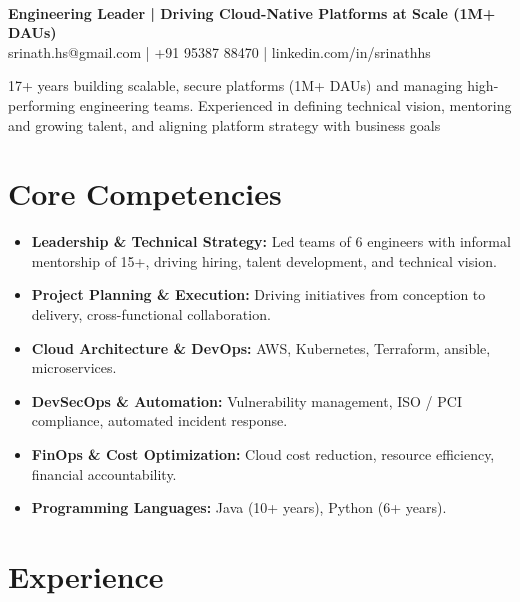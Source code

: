 \documentclass[11pt]{article}
\newcommand{\name}[1]{\noindent{\LARGE\sffamily\textbf{#1}}}
\begin{document}
\pagestyle{empty}
\color{bodytext}

\name{Srinath H S}\\[0.5em]
\textbf{Engineering Leader | Driving Cloud-Native Platforms at Scale (1M+ DAUs)
}\\[0.3em]
srinath.hs@gmail.com \quad | \quad +91 95387 88470 \quad | \quad linkedin.com/in/srinathhs

17+ years building scalable, secure platforms (1M+ DAUs) and managing high-performing engineering teams. Experienced in defining technical vision, mentoring and growing talent, and aligning platform strategy with business goals

\section*{Core Competencies}
\begin{itemize}[leftmargin=*, itemsep=-0.5em]
  \item \textbf{Leadership \& Technical Strategy:} Led teams of 6 engineers with informal mentorship of 15+, driving hiring, talent development, and technical vision.
  \item \textbf{Project Planning \& Execution:} Driving initiatives from conception to delivery, cross-functional collaboration.
  \item \textbf{Cloud Architecture \& DevOps:} AWS, Kubernetes, Terraform, ansible, microservices.
  \item \textbf{DevSecOps \& Automation:} Vulnerability management, ISO / PCI compliance, automated incident response.
  \item \textbf{FinOps \& Cost Optimization:} Cloud cost reduction, resource efficiency, financial accountability.
  \item \textbf{Programming Languages:} Java (10+ years), Python (6+ years).
\end{itemize}

\section*{Experience}
\end{document}

